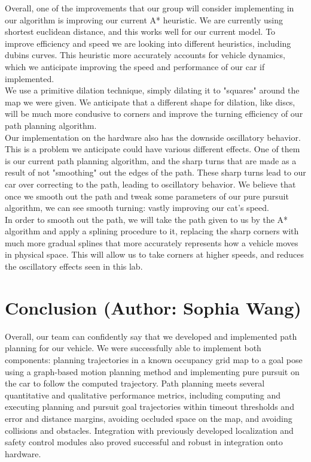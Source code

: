 \documentclass{article}
\begin{document}
Overall, one of the improvements that our group will consider implementing in our algorithm is improving our current A* heuristic. We are currently using shortest euclidean distance, and this works well for our current model. To improve efficiency and speed we are looking into different heuristics, including dubins curves. This heuristic more accurately accounts for vehicle dynamics, which we anticipate improving the speed and performance of our car if implemented. \\

We use a primitive dilation technique, simply dilating it to "squares" around the map we were given. We anticipate that a different shape for dilation, like discs, will be much more condusive to corners and improve the turning efficiency of our path planning algorithm.\\

Our implementation on the hardware also has the downside oscillatory behavior. This is a problem we anticipate could have various different effects. One of them is our current path planning algorithm, and the sharp turns that are made as a result of not "smoothing" out the edges of the path. These sharp turns lead to our car over correcting to the path, leading to oscillatory behavior. We believe that once we smooth out the path and tweak some parameters of our pure pursuit algorithm, we can see smooth turning: vastly improving our cat's speed. \\

In order to smooth out the path, we will take the path given to us by the A* algorithm and apply a splining procedure to it, replacing the sharp corners with much more gradual splines that more accurately represents how a vehicle moves in physical space. This will allow us to take corners at higher speeds, and reduces the oscillatory effects seen in this lab. \\
\section{Conclusion (Author: Sophia Wang)}

Overall, our team can confidently say that we developed and implemented path planning for our vehicle. We were successfully able to implement both components: planning trajectories in a known occupancy grid map to a goal pose using a graph-based motion planning method and implementing pure pursuit on the car to follow the computed trajectory. Path planning meets several quantitative and qualitative performance metrics, including computing and executing planning and pursuit goal trajectories within timeout thresholds and error and distance margins, avoiding occluded space on the map, and avoiding collisions and obstacles. Integration with previously developed localization and safety control modules also proved successful and robust in integration onto hardware. \\
\end{document}
